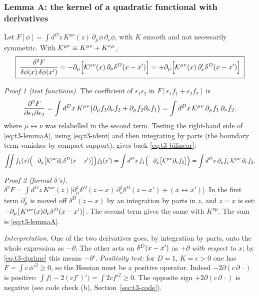 \subsubsection{Lemma A: the kernel of a quadratic functional with derivatives \texorpdfstring{\tD}{}}
Let \(F[\phi]=\int d^Dz\,K^{\mu\nu}(z)\,\partial_\mu\phi\,\partial_\nu\phi\), with \(K\)
smooth and not necessarily symmetric. With \(\mathcal K^{\mu\nu}\equiv K^{\mu\nu}+K^{\nu\mu}\),
\begin{equation}\label{eq:t3-lemmaA}
\boxed{\;\frac{\delta^2F}{\delta\phi(x)\,\delta\phi(x')}
=-\partial_\mu\Bigl[\mathcal K^{\mu\nu}(x)\,\partial_\nu\delta^D(x-x')\Bigr]
=+\partial_\mu\Bigl[\mathcal K^{\mu\nu}(x)\,\partial'_\nu\delta^D(x-x')\Bigr]\;}
\end{equation}

\emph{Proof 1 (test functions).} The coefficient of \(\epsilon_1\epsilon_2\) in
\(F[\epsilon_1f_1+\epsilon_2f_2]\) is
\begin{equation}\label{eq:t3-bilinear}
\frac{\partial^2F}{\partial\epsilon_1\partial\epsilon_2}
=\int d^Dx\,K^{\mu\nu}\bigl(\partial_\mu f_1\partial_\nu f_2+\partial_\mu f_2\partial_\nu f_1\bigr)
=\int d^Dx\,\mathcal K^{\mu\nu}\,\partial_\mu f_1\,\partial_\nu f_2 ,
\end{equation}
where \(\mu\leftrightarrow\nu\) was relabelled in the second term. Testing the right-hand
side of \eqref{eq:t3-lemmaA}, using \eqref{eq:t3-ident} and then integrating by parts
(the boundary term vanishes by compact support), gives back \eqref{eq:t3-bilinear}:
\begin{equation*}
\iint f_1(x)\Bigl(-\partial_\mu\bigl[\mathcal K^{\mu\nu}\partial_\nu\delta^D(x-x')\bigr]\Bigr)f_2(x')
=\int d^Dx\,f_1\Bigl(-\partial_\mu\bigl[\mathcal K^{\mu\nu}\partial_\nu f_2\bigr]\Bigr)
=\int d^Dx\,\partial_\mu f_1\,\mathcal K^{\mu\nu}\,\partial_\nu f_2 .
\end{equation*}

\emph{Proof 2 (formal \(\delta\)'s).}
\(\delta^2F=\int d^Dz\,K^{\mu\nu}(z)\bigl[\partial^z_\mu\delta^D(z-x)\,\partial^z_\nu\delta^D(z-x')+(x\leftrightarrow x')\bigr]\).
In the first term \(\partial^z_\mu\) is moved off \(\delta^D(z-x)\) by an integration by
parts in \(z\), and \(z=x\) is set:
\(-\partial_\mu\bigl[K^{\mu\nu}(x)\partial_\nu\delta^D(x-x')\bigr]\). The second term gives the
same with \(K^{\nu\mu}\). The sum is \eqref{eq:t3-lemmaA}.

\emph{Interpretation.} One of the two derivatives goes, by integration by parts, onto the
whole expression as \(-\partial\). The other acts on \(\delta^D(x-x')\) as \(+\partial\)
\emph{with respect to \(x\)}; by \eqref{eq:t3-dprime} this means \(-\partial'\).
\emph{Positivity test:} for \(D=1\), \(K=c>0\) one has \(F=\int c\,\phi'^2\ge0\), so the
Hessian must be a positive operator. Indeed \(-2\partial(c\,\partial\,\cdot)\) is positive:
\(\int f\bigl(-2(cf')'\bigr)=\int2cf'^2\ge0\). The opposite sign
\(+2\partial(c\,\partial\,\cdot)\) is negative (see code check (b),
Section~\ref{sec:t3-code}).

